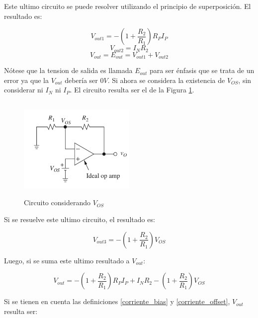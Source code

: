 \documentclass[12pt,a4paper]{article}
\begin{document}
Este ultimo circuito se puede resolver utilizando el principio de superposición. El resultado es:


\begin{displaymath} V_{out1} = -(1+\frac{R_2}{R_1})R_P I_P \end{displaymath}
\begin{displaymath} V_{out2} = I_N R_2 \end{displaymath}
\begin{displaymath} V_{out} = E_{out} = V_{out1} + V_{out2} \end{displaymath}

Nótese que la tension de salida es llamada $E_{out}$ para ser énfasis que se trata de un error ya que la $V_{out}$ debería ser $0V$. 
Si ahora se considera la existencia de $V_{OS}$, sin considerar  ni $I_{N}$ ni $I_{P}$. El circuito resulta ser el de la Figura \ref{fig_3}.
 

\begin{figure}[ht]                                                       
    \centering\includegraphics[width=0.5\textwidth, height=5cm]{Figuras/fig_3.png}
    \caption{Circuito considerando $V_{OS}$}
    \label{fig_3}
    \end{figure}


Si se resuelve este ultimo circuito, el resultado es:

\begin{displaymath} V_{out3} = -(1+\frac{R_2}{R_1})V_{OS} \end{displaymath}

Luego, si se suma este ultimo resultado a $V_{out}$:

\begin{equation} V_{out} = -(1+\frac{R_2}{R_1})R_PI_P + I_N R_2 -(1+\frac{R_2}{R_1})V_{OS} \label{V_out_teorico}\end{equation}

Si se tienen en cuenta las definiciones \ref{corriente_bias} y \ref{corriente_offset}, $V_{out}$ resulta ser:
\end{document}
